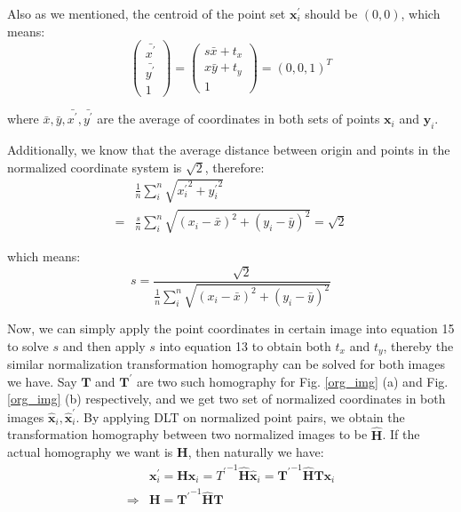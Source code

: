 \documentclass[conference]{IEEEtran}
\newcommand{\mat}[1]{\mathbf{#1}} %
\begin{document}
Also as we mentioned, the centroid of the point set ${\mat{x}}_i^\prime$ should be $(0, 0)$, which means:
\begin{equation}
	\begin{pmatrix}
		\bar{x^\prime}\\
		\bar{y^\prime}\\
		1
	\end{pmatrix} = 
	\begin{pmatrix}
		s\bar{x} + t_x\\
		x\bar{y} + t_y\\
		1
	\end{pmatrix} = (0, 0, 1)^T
\end{equation}

where $\bar{x}, \bar{y}, \bar{x^\prime}, \bar{y^\prime}$ are the average of coordinates in both sets of points $\mat{x}_i$ and $\mat{y}_i$.

Additionally, we know that the average distance between origin and points in the normalized coordinate system is $\sqrt{2}$, therefore:
\begin{equation}
	\begin{split}
		&\frac{1}{n}\sum _{i}^n\sqrt{{x_i^\prime}^2 + {y_i^\prime}^2}\\
		=&\frac{s}{n}\sum_{i}^n\sqrt{(x_i - \bar{x})^2 + (y_i - \bar{y})^2} = \sqrt{2}
	\end{split}
\end{equation}

which means:
\begin{equation}
	s = \frac{\sqrt{2}}{\frac{1}{n}\sum_i^n\sqrt{(x_i - \bar{x})^2 + (y_i - \bar{y})^2}}
\end{equation}

Now, we can simply apply the point coordinates in certain image into equation 15 to solve $s$ and then apply $s$ into equation 13 to obtain both $t_x$ and $t_y$, thereby the similar normalization transformation homography can be solved for both images we have. Say $\mat{T}$ and $\mat{T}^\prime$ are two such homography for Fig. \ref{org_img} (a) and Fig.\ref{org_img} (b) respectively, and we get two set of normalized coordinates in both images $\hat{\mat{x}}_i, \hat{\mat{x}}_i^\prime$. By applying DLT on normalized point pairs, we obtain the transformation homography between two normalized images to be $\hat{\mat{H}}$. If the actual homography we want is $\mat{H}$, then naturally we have:
\begin{equation}
\begin{split}
	&\mat{x}_i^\prime = \mat{H}\mat{x}_i = {T^\prime}^{-1}\hat{\mat{H}}\hat{\mat{x}}_i = \mat{T^\prime}^{-1}\hat{\mat{H}}\mat{T}\mat{x}_i\\
	\Rightarrow &\mat{H} = {\mat{T}^\prime}^{-1}\hat{\mat{H}}\mat{T}
\end{split}
\end{equation}
\end{document}
